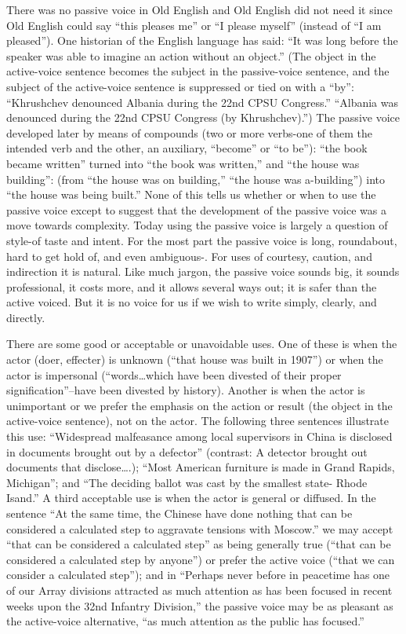 \documentclass[
    oneside,
    11pt,
    draft
]{memoir}
\begin{document}
There was no passive voice in Old English and Old English did not need it since Old English could say \enquote{this pleases me} or \enquote{I please myself} (instead of \enquote{I am pleased}). One historian of the English language has said: \enquote{It was long before the speaker was able to imagine an action without an object.} (The object in the active-voice sentence becomes the subject in the passive-voice sentence, and the subject of the active-voice sentence is suppressed or tied on with a \enquote{by}: \enquote{Khrushchev denounced Albania during the 22nd CPSU Congress.} \enquote{Albania was denounced during the 22nd CPSU Congress (by Khrushchev).}) The passive voice developed later by means of compounds (two or more verbs-one of them the intended verb and the other, an auxiliary, \enquote{become} or \enquote{to be}): \enquote{the book became written} turned into \enquote{the book was written,} and \enquote{the house was building}: (from \enquote{the house was on building,} \enquote{the house was a-building}) into \enquote{the house was being built.} None of this tells us whether or when to use the passive voice except to suggest that the development of the passive voice was a move towards complexity. Today using the passive voice is largely a question of style-of taste and intent. For the most part the passive voice is long, roundabout, hard to get hold of, and even ambiguous-. For uses of courtesy, caution, and indirection it is natural. Like much jargon, the passive voice sounds big, it sounds professional, it costs more, and it allows several ways out; it is safer than the active voiced. But it is no voice for us if we wish to write simply, clearly, and directly. 

There are some good or acceptable or unavoidable uses. One of these is when the actor (doer, effecter) is unknown (\enquote{that house was built in 1907}) or when the actor is impersonal (\enquote{words\dots which have been divested of their proper signification}--have been divested by history). Another is when the actor is unimportant or we prefer the emphasis on the action or result (the object in the active-voice sentence), not on the actor. The following three sentences illustrate this use: \enquote{Widespread malfeasance among local supervisors in China is disclosed in documents brought out by a defector} (contrast: A detector brought out documents that disclose\dots.); \enquote{Most American furniture is made in Grand Rapids, Michigan}; and \enquote{The deciding ballot was cast by the smallest state- Rhode Isand.} A third acceptable use is when the actor is general or diffused. In the sentence \enquote{At the same time, the Chinese have done nothing that can be considered a calculated step to aggravate tensions with Moscow.} we may accept \enquote{that can be considered a calculated step} as being generally true (\enquote{that can be considered a calculated step by anyone}) or prefer the active voice (\enquote{that we can consider a calculated step}); and in \enquote{Perhaps never before in peacetime has one of our Array divisions attracted as much attention as has been focused in recent weeks upon the 32nd Infantry Division,} the passive voice may be as pleasant as the active-voice alternative, \enquote{as much attention as the public has focused.}
\end{document}
